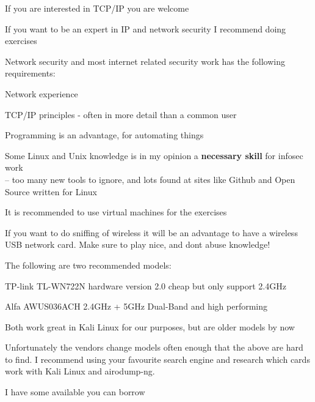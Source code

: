 \documentclass[Screen16to9,17pt]{foils}
\begin{document}

If you are interested in TCP/IP you are welcome

If you want to be an expert in IP and network security I recommend doing exercises

\begin{list1}
\item Network security and most internet related security work has the following requirements:
\begin{list2}
\item Network experience
\item TCP/IP principles - often in more detail than a common user
\item Programming is an advantage, for automating things
\item Some Linux and Unix knowledge is in my opinion a {\bf necessary skill} for infosec work\\
-- too many new tools to ignore, and lots found at sites like Github and Open Source written for Linux
\end{list2}
\item It is recommended to use virtual machines for the exercises
\end{list1}




If you want to do sniffing of wireless it will be an advantage to have a wireless USB network card. Make sure to play nice, and dont abuse knowledge!

\begin{list2}
\item The following are two recommended models:
\item TP-link TL-WN722N hardware version 2.0 cheap but only support 2.4GHz
\item Alfa AWUS036ACH 2.4GHz + 5GHz Dual-Band and high performing
\item Both work great in Kali Linux for our purposes, but are older models by now
\end{list2}

Unfortunately the vendors change models often enough that the above are hard to find. I recommend using your favourite search engine and research which cards work with Kali Linux and airodump-ng.

I have some available you can borrow




\end{document}
